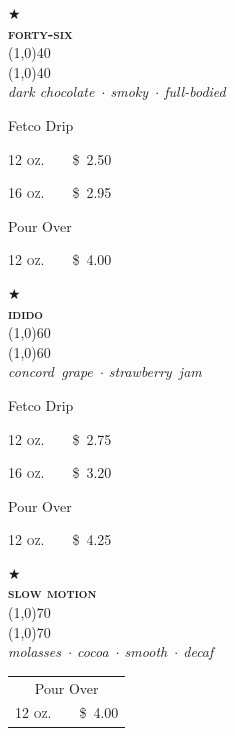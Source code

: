 \documentclass[letterpaper, 12pt]{article}%
\newcommand{\menuitem}[4]{
 \centering
  $\bigstar$\\
  \bigskip
  \textbf{\sffamily \textsc{\large#2}}\vspace{-1ex}\\
  \line(1,0){#1}\vspace{-2ex}\\
  \line(1,0){#1}\vspace{0.5ex}\\
  \smallskip
  \emph{\footnotesize#3}\\
  \vspace*{\fill}
  {\small#4}
}
\newcommand{\flowtherefore}{~~\raisebox{0.2ex}{$\therefore$}~~}
\newcommand{\price}[2]{
 \textsc{\small#1}\flowtherefore\$~\textsc{\small#2}
}
\begin{document}
{\centering
 \begin{minipage}[t][0.26\textwidth][b]{0.3\textwidth}
  \centering
  \menuitem{40}{
   forty-six}{
   dark chocolate~$\cdot$ smoky~$\cdot$ full-bodied}{
   Fetco Drip
   
   \price{12 oz.}{2.50}
   
   \price{16 oz.}{2.95}   
   
   Pour Over
   
   \price{12 oz.}{4.00}
  }
 \end{minipage} 
 \begin{minipage}[t][0.26\textwidth][b]{0.3\textwidth}
  \centering
  \menuitem{60}{
   idido}{
   concord~grape~$\cdot$ strawberry~jam}{
   Fetco Drip
   
   \price{12 oz.}{2.75}
   
   \price{16 oz.}{3.20}
   
   Pour Over
   
   \price{12 oz.}{4.25}
  } 
 \end{minipage} 
 \begin{minipage}[t][0.22\textwidth][b]{0.3\textwidth}
  \centering
  \menuitem{70}{
   slow motion}{
   molasses~$\cdot$ cocoa~$\cdot$ smooth~$\cdot$ decaf}{
   \begin{tabular}{@{} c @{}}
   Pour Over\\
   \price{12 oz.}{4.00}\\
   \end{tabular}
   
   \rule{0pt}{1.1em}
  }
 \end{minipage} 
 
}

\rule{0pt}{0pt}
\end{document}
